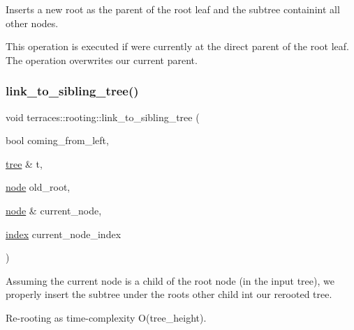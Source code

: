 Inserts a new root as the parent of the root leaf and the subtree containint all other nodes.

This operation is executed if we\textquotesingle{}re currently at the direct parent of the root leaf. The operation overwrites our current parent. \mbox{\label{namespaceterraces_1_1rooting_a27b5d633461a2008842a40402a9cb1c0}} 
\subsubsection{\texorpdfstring{link\+\_\+to\+\_\+sibling\+\_\+tree()}{link\_to\_sibling\_tree()}}
{\footnotesize\ttfamily void terraces\+::rooting\+::link\+\_\+to\+\_\+sibling\+\_\+tree (\begin{DoxyParamCaption}\item[{bool}]{coming\+\_\+from\+\_\+left,  }\item[{\hyperlink{namespaceterraces_a07aaf7feec4a22c6cdefc14c5a81bdd0}{tree} \&}]{t,  }\item[{\hyperlink{structterraces_1_1node}{node}}]{old\+\_\+root,  }\item[{\hyperlink{structterraces_1_1node}{node} \&}]{current\+\_\+node,  }\item[{\hyperlink{namespaceterraces_adbc33ccb543d1634e96d0eb02e472c77}{index}}]{current\+\_\+node\+\_\+index }\end{DoxyParamCaption})}

Assuming the current node is a child of the root node (in the input tree), we properly insert the subtree under the root\textquotesingle{}s other child int our rerooted tree.

Re-\/rooting as time-\/complexity O(tree\+\_\+height). 